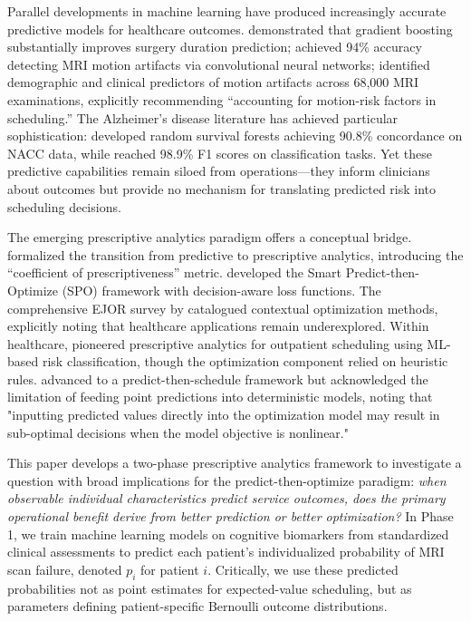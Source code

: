 \documentclass[11pt,a4paper]{article}
\begin{document}
Parallel developments in machine learning have produced increasingly accurate predictive models for healthcare outcomes. \citet{bartek2019improving} demonstrated that gradient boosting substantially improves surgery duration prediction; \citet{vakli2023automatic} achieved 94\% accuracy detecting MRI motion artifacts via convolutional neural networks; \citet{porembka2025disparities} identified demographic and clinical predictors of motion artifacts across 68,000 MRI examinations, explicitly recommending ``accounting for motion-risk factors in scheduling.'' The Alzheimer's disease literature has achieved particular sophistication: \citet{song2023random} developed random survival forests achieving 90.8\% concordance on NACC data, while \citet{elsappagh2024explainable} reached 98.9\% F1 scores on classification tasks. Yet these predictive capabilities remain siloed from operations---they inform clinicians about outcomes but provide no mechanism for translating predicted risk into scheduling decisions.

The emerging prescriptive analytics paradigm offers a conceptual bridge. \citet{bertsimas2020predictive} formalized the transition from predictive to prescriptive analytics, introducing the ``coefficient of prescriptiveness'' metric. \citet{elmachtoub2022smart} developed the Smart Predict-then-Optimize (SPO) framework with decision-aware loss functions. The comprehensive EJOR survey by \citet{sadana2025contextual} catalogued contextual optimization methods, explicitly noting that healthcare applications remain underexplored. Within healthcare, \citet{srinivas2018prescriptive} pioneered prescriptive analytics for outpatient scheduling using ML-based risk classification, though the optimization component relied on heuristic rules. \citet{salah2022predict} advanced to a predict-then-schedule framework but acknowledged the limitation of feeding point predictions into deterministic models, noting that "inputting predicted values directly into the optimization model may result in sub-optimal decisions when the model objective is nonlinear."

This paper develops a two-phase prescriptive analytics framework to investigate a question with broad implications for the predict-then-optimize paradigm: \textit{when observable individual characteristics predict service outcomes, does the primary operational benefit derive from better prediction or better optimization?} In Phase 1, we train machine learning models on cognitive biomarkers from standardized clinical assessments to predict each patient's individualized probability of MRI scan failure, denoted $p_i$ for patient $i$. Critically, we use these predicted probabilities not as point estimates for expected-value scheduling, but as parameters defining patient-specific Bernoulli outcome distributions.
\end{document}
